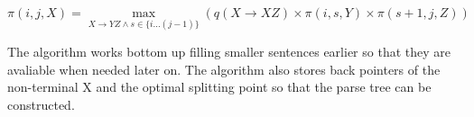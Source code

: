 $$ \pi(i,j,X) = \max_{X \rightarrow YZ \wedge s \in \{i ... (j-1)\}}(q(X \rightarrow XZ) \times \pi(i,s,Y) \times \pi(s+1,j,Z))$$

The algorithm works bottom up filling smaller sentences earlier so that they are avaliable when needed later on.
The algorithm also stores back pointers of the non-terminal X and the optimal splitting point so that the parse tree can be constructed.  
\cite[p.13]{collins}






















